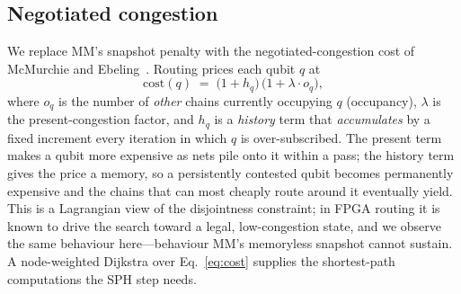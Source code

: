 \documentclass[acmsmall,anonymous,nonacm]{acmart}
\begin{document}
\subsection{Negotiated congestion}
\label{sec:negotiation}
We replace MM's snapshot penalty with the negotiated-congestion cost of
McMurchie and Ebeling~\cite{mcmurchie1995pathfinder}. Routing prices each qubit
$q$ at
\begin{equation}
  \mathrm{cost}(q) \;=\; \bigl(1 + h_q\bigr)\,\bigl(1 + \lambda \cdot o_q\bigr),
  \label{eq:cost}
\end{equation}
where $o_q$ is the number of \emph{other} chains currently occupying $q$
(occupancy), $\lambda$ is the present-congestion factor, and $h_q$ is a
\emph{history} term that \emph{accumulates} by a fixed increment every iteration
in which $q$ is over-subscribed. The present term makes a qubit more expensive as
nets pile onto it within a pass; the history term gives the price a memory, so a
persistently contested qubit becomes permanently expensive and the chains that
can most cheaply route around it eventually yield. This is a Lagrangian view of
the disjointness constraint; in FPGA routing it is known to drive the search
toward a legal, low-congestion state, and we observe the same behaviour
here---behaviour MM's memoryless snapshot cannot sustain. A
node-weighted Dijkstra over Eq.~\eqref{eq:cost} supplies the shortest-path
computations the SPH step needs.
\end{document}
